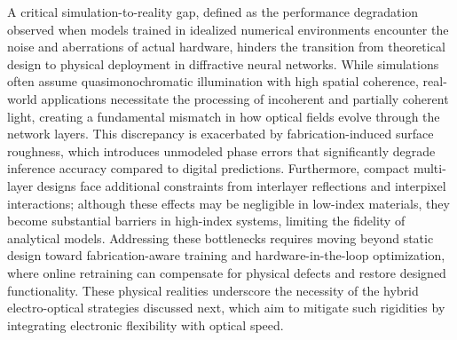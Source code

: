 \documentclass[11pt]{article}
\begin{document}
A critical simulation-to-reality gap, defined as the performance degradation observed when models trained in idealized numerical environments encounter the noise and aberrations of actual hardware, hinders the transition from theoretical design to physical deployment in diffractive neural networks. While simulations often assume quasimonochromatic illumination with high spatial coherence, real-world applications necessitate the processing of incoherent and partially coherent light, creating a fundamental mismatch in how optical fields evolve through the network layers. \citep{doi_10_1364_oe_523619_ddeb1b53} This discrepancy is exacerbated by fabrication-induced surface roughness, which introduces unmodeled phase errors that significantly degrade inference accuracy compared to digital predictions. Furthermore, compact multi-layer designs face additional constraints from interlayer reflections and interpixel interactions; although these effects may be negligible in low-index materials, they become substantial barriers in high-index systems, limiting the fidelity of analytical models. Addressing these bottlenecks requires moving beyond static design toward fabrication-aware training and hardware-in-the-loop optimization, where online retraining can compensate for physical defects and restore designed functionality. These physical realities underscore the necessity of the hybrid electro-optical strategies discussed next, which aim to mitigate such rigidities by integrating electronic flexibility with optical speed. \citep{doi_10_1038_s41598_025_19638_8_1b2db1c9} \citep{doi_10_1364_oe_523619_ddeb1b53} \citep{doi_10_1109_dac56929_2023_10247715_f78d6713} \citep{doi_10_1364_ol_477605_b9242e3a}
\end{document}
